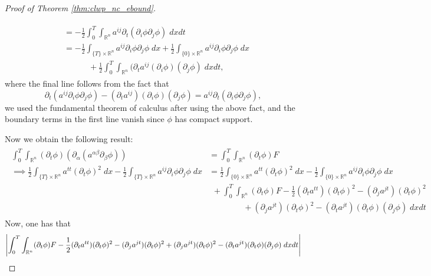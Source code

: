 \documentclass{article}
\begin{document}
\begin{proof}[Proof of Theorem \ref{thm:clwp_nc_ebound}]
\begin{enumerate}[itemsep =-2pt,label = (\arabic{*})]
\begin{align*}
\begin{split}
				&= -\frac{1}{2}\int_{0}^{T}\int_{\mathbb{R}^{n}}a^{ij}\partial_{t}(\partial_{i}\phi\partial_{j}\phi)\;dxdt  \\
				&= -\frac{1}{2}\int_{\{T\} \times \mathbb{R}^{n}}a^{ij}\partial_{i}\phi \partial_{j}\phi\;dx + \frac{1}{2}\int_{\{0\} \times \mathbb{R}^{n}}a^{ij}\partial_{i}\phi\partial_{j}\phi \;dx  \\ &\qquad\quad + \frac{1}{2}\int_{0}^{T}\int_{\mathbb{R}^n}(\partial_{t}a^{ij}(\partial_{i}\phi)(\partial_{j}\phi)\;dxdt, 
			\end{split}
		\end{align*}
		where the final line follows from the fact that 
		\begin{equation*}
			\partial_{t}(a^{ij}\partial_{i}\phi\partial_{j}\phi) - (\partial_{t}a^{ij})(\partial_{i}\phi)(\partial_{j}\phi) = a^{ij}\partial_{t}(\partial_{i}\phi\partial_{j}\phi), 
		\end{equation*}
		we used the fundamental theorem of calculus after using the above fact, and the boundary terms in the first line vanish since $\phi$ has compact support. 
	\end{enumerate}
	Now we obtain the following result: 
	\begin{align*}
		\begin{split}
			\int_{0}^{T}\int_{\mathbb{R}^{n}}(\partial_{t}\phi)(\partial_{\alpha}(a^{\alpha\beta}\partial_{\beta}\phi)) &= \int_{0}^{T}\int_{\mathbb{R}^{n}}(\partial_{t}\phi)F \\
			\implies 
			\frac{1}{2}\int_{\{T\} \times \mathbb{R}^{n}}a^{tt}(\partial_{t}\phi)^{2}\;dx -\frac{1}{2}\int_{\{T\}\times \mathbb{R}^{n}}a^{ij}\partial_{i}\phi\partial_{j}\phi\;dx &= \frac{1}{2}\int_{\{0\} \times \mathbb{R}^{n}}a^{tt}(\partial_{t}\phi)^{2}\;dx  -\frac{1}{2}\int_{\{0\} \times \mathbb{R}^{n}}a^{ij}\partial_{i}\phi\partial_{j}\phi\;dx \\
			&\hspace{5pt}+\int_{0}^{T}\int_{\mathbb{R}^{n}}(\partial_{t}\phi)F - \frac{1}{2}(\partial_{t}a^{tt})(\partial_{t}\phi)^{2} - (\partial_{j}a^{jt})(\partial_{t}\phi)^{2} \\
			&\qquad\qquad\hspace{2pt}+(\partial_{j}a^{jt})(\partial_{t}\phi)^{2} - (\partial_{t}a^{jt})(\partial_{t}\phi)(\partial_{j}\phi)\;dxdt
		\end{split}
	\end{align*}
	Now, one has that 
	\begin{multline*}
		\abs{\int_{0}^{T}\int_{\mathbb{R}^{n}}(\partial_{t}\phi)F - \frac{1}{2}(\partial_{t}a^{tt})(\partial_{t}\phi)^{2} - (\partial_{j}a^{jt})(\partial_{t}\phi)^{2}+(\partial_{j}a^{jt})(\partial_{t}\phi)^{2} - (\partial_{t}a^{jt})(\partial_{t}\phi)(\partial_{j}\phi)\;dxdt} \\

\end{multline*}
\end{proof}
\end{document}

